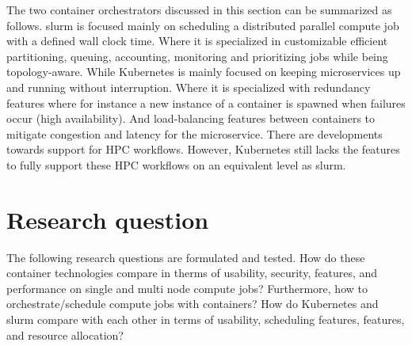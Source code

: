 \documentclass[conference]{IEEEtran}
\begin{document}
The two container orchestrators discussed in this section can be summarized as follows. \gls{slurm} is focused mainly on scheduling a distributed parallel compute job with a defined wall clock time. Where it is specialized in customizable efficient partitioning, queuing, accounting, monitoring and prioritizing jobs while being topology-aware. While Kubernetes is mainly focused on keeping microservices up and running without interruption. Where it is specialized with redundancy features where for instance a new instance of a container is spawned when failures occur (high availability). And load-balancing features between containers to mitigate congestion and latency for the microservice. There are developments towards support for HPC workflows. However, Kubernetes still lacks the features to fully support these HPC workflows on an equivalent level as \gls{slurm}.






\section{Research question}
\label{research-question}
The following research questions are formulated and tested. How do these container technologies compare in therms of usability, security, features, and performance on single and multi node compute jobs? Furthermore, how to orchestrate/schedule compute jobs with containers? How do Kubernetes and \gls{slurm} compare with each other in terms of usability, scheduling features, features, and resource allocation?
\end{document}
